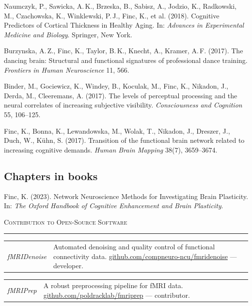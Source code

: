 \documentclass[10pt, a4paper]{article}
\makeatletter
\newcommand{\cvsection}[1]{%
  \vspace{1.4em}%
  {\large\scshape #1}%
  \vspace{0.25em}%
  \par\noindent\textcolor{rule}{\rule{\linewidth}{0.4pt}}%
  \vspace{0.5em}%
}
\newcommand{\cventry}[2]{%
  \begin{tabular*}{\linewidth}{@{}p{2.8cm}@{\hspace{0.5em}}p{\dimexpr\linewidth-3.3cm}@{}}
    \textcolor{accent}{\small\itshape #1} & #2 \\[0.2em]
  \end{tabular*}%
}
\newenvironment{cvlist}{%
  \begin{enumerate}[leftmargin=2em, label={[\arabic*]}, itemsep=0.25em, parsep=0pt]%
}{%
  \end{enumerate}%
}
\makeatother
\begin{document}
\begin{cvlist}
\item Naumczyk, P., Sawicka, A.\,K., Brzeska, B., Sabisz, A., Jodzio, K., Radkowski, M., Czachowska, K., Winklewski, P.\,J., Finc, K., et al. (2018). Cognitive Predictors of Cortical Thickness in Healthy Aging. In: \textit{Advances in Experimental Medicine and Biology}. Springer, New York.

\item Burzynska, A.\,Z., Finc, K., Taylor, B.\,K., Knecht, A., Kramer, A.\,F. (2017). The dancing brain: Structural and functional signatures of professional dance training. \textit{Frontiers in Human Neuroscience} 11, 566.

\item Binder, M., Gociewicz, K., Windey, B., Koculak, M., Finc, K., Nikadon, J., Derda, M., Cleeremans, A. (2017). The levels of perceptual processing and the neural correlates of increasing subjective visibility. \textit{Consciousness and Cognition} 55, 106--125.

\item Finc, K., Bonna, K., Lewandowska, M., Wolak, T., Nikadon, J., Dreszer, J., Duch, W., K\"uhn, S. (2017). Transition of the functional brain network related to increasing cognitive demands. \textit{Human Brain Mapping} 38(7), 3659--3674.

\end{cvlist}

\subsection*{\normalsize Chapters in books}

\begin{cvlist}

\item Finc, K. (2023). Network Neuroscience Methods for Investigating Brain Plasticity. In: \textit{The Oxford Handbook of Cognitive Enhancement and Brain Plasticity}.

\end{cvlist}

\cvsection{Contribution to Open-Source Software}

\cventry{fMRIDenoise}{Automated denoising and quality control of functional connectivity data. \href{https://github.com/compneuro-ncu/fmridenoise}{github.com/compneuro-ncu/fmridenoise} — developer.}

\cventry{fMRIPrep}{A robust preprocessing pipeline for fMRI data. \href{https://github.com/poldracklab/fmriprep}{github.com/poldracklab/fmriprep} — contributor.}
\end{document}
